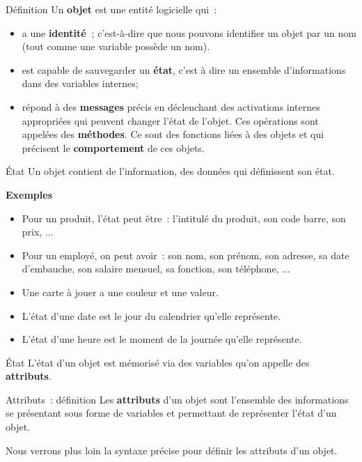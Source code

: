 \begin{frame}{Définition}
	Un \textbf{objet} est une entité logicielle qui~:
	
		\begin{itemize}
		\item 
			a une \textbf{identité~}; c'est-à-dire que nous pouvons
			identifier un objet par un nom (tout comme une variable possède un
			nom).
		\item 
			est capable de sauvegarder un \textbf{état}, c'est à
			dire un ensemble d'informations dans des variables
			internes;
		\item 
			répond à des \textbf{messages} précis en déclenchant des activations
			internes appropriées qui peuvent changer l'état de
			l'objet. Ces opérations sont appelées des
			\textbf{méthodes}. Ce sont des fonctions liées à des objets et qui
			précisent le \textbf{comportement} de ces objets.
		\end{itemize}
\end{frame}

\begin{frame}{État}
	Un objet contient de l'information, des données qui
	définissent son état.

	\textbf{Exemples}	
	\begin{itemize}
	\item 
		Pour un produit, l'état peut être~:
		l'intitulé du produit, son code barre, son prix, ... 
	\item 
		Pour un employé, on peut avoir~: son nom, son prénom, son adresse, sa
		date d'embauche, son salaire mensuel, sa fonction, son
		téléphone, ... 
	\item 
		Une carte à jouer a une couleur et une valeur.
	\item 
		L'état d'une date est le jour du
		calendrier qu'elle représente.
	\item 
		L'état d'une heure est le moment de la
		journée qu'elle représente.
	\end{itemize}
\end{frame}
	
\begin{frame}{État}
		L'état d'un objet est mémorisé via des
		variables qu'on appelle des \textbf{attributs}.

\end{frame}
	
\begin{frame}{Attributs~: définition}
	Les \textbf{attributs} d'un objet sont
	l'ensemble des informations se présentant sous forme
	de variables et permettant de représenter l'état
	d'un objet.
	
	\bigskip

	Nous verrons plus loin la syntaxe précise 
	pour définir les attributs d'un objet.

\end{frame}
	
